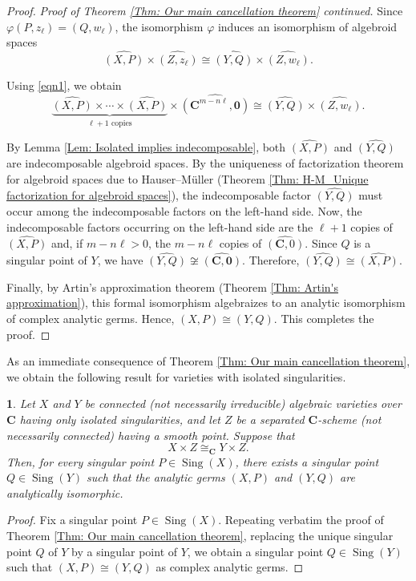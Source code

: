 \documentclass[10pt,a4paper]{amsart}
\numberwithin{equation}{section}
\numberwithin{figure}{section}
\newtheorem{cor}[thm]{\protect\corollaryname}
\providecommand{\corollaryname}{Corollary}
\numberwithin{equation}{section}
\newcommand{\C}{\mathbf{C}}
\newcommand{\oo}{\mathbf{0}}
\newcommand{\Sing}{\operatorname{Sing}}
\begin{document}
\begin{proof}
\medskip

\textit{Proof of Theorem \ref{Thm: Our main cancellation theorem} continued.}
Since $\varphi(P,z_\ell)=(Q,w_\ell)$, the isomorphism $\varphi$ induces an isomorphism of algebroid spaces
\[
\widehat{(X,P)}
\times
\widehat{(Z,z_\ell)}
\cong
\widehat{(Y,Q)}
\times
\widehat{(Z,w_\ell)}.
\]

Using \eqref{eqn1}, we obtain
\[
\underbrace{\widehat{(X,P)}\times \cdots \times \widehat{(X,P)}}_{\ell+1\text{ copies}}
\times
\widehat{(\C^{m-n\ell},\oo)}
\cong
\widehat{(Y,Q)}
\times
\widehat{(Z,w_\ell)}.
\]

By Lemma \ref{Lem: Isolated implies indecomposable}, both $\widehat{(X,P)}$ and $\widehat{(Y,Q)}$ are indecomposable algebroid spaces. By the uniqueness of factorization theorem for algebroid spaces due to Hauser--M\"uller (Theorem \ref{Thm: H-M_Unique factorization for algebroid spaces}), the indecomposable factor $\widehat{(Y,Q)}$ must occur among the indecomposable factors on the left-hand side. Now, the indecomposable factors occurring on the left-hand side are the $\ell+1$ copies of $\widehat{(X,P)}$ and, if $m-n\ell>0$, the $m-n\ell$ copies of $\widehat{(\C,0)}$. Since $Q$ is a singular point of $Y$, we have
$\widehat{(Y,Q)}\not\cong\widehat{(\C,\oo)}$. Therefore, $\widehat{(Y,Q)}\cong \widehat{(X,P)}$.

Finally, by Artin's approximation theorem (Theorem \ref{Thm: Artin's approximation}), this formal isomorphism algebraizes to an analytic isomorphism of complex analytic germs. Hence, $(X,P)\cong (Y,Q)$. This completes the proof.
\end{proof}

As an immediate consequence of Theorem \ref{Thm: Our main cancellation theorem}, we obtain the following result for varieties with isolated singularities.

\begin{cor}\label{Cor: Cancellation theorem for isolated singularities}
Let $X$ and $Y$ be connected (not necessarily irreducible) algebraic varieties over $\C$ having only isolated singularities, and let $Z$ be a separated $\C$-scheme (not necessarily connected) having a smooth point. Suppose that
\[
X\times Z \cong_{\C} Y\times Z.
\]
Then, for every singular point $P\in \Sing(X)$, there exists a singular point $Q\in \Sing(Y)$ such that the analytic germs $(X,P)$ and $(Y,Q)$ are analytically isomorphic.
\end{cor}

\begin{proof}
Fix a singular point $P\in \Sing(X)$. Repeating verbatim the proof of Theorem \ref{Thm: Our main cancellation theorem}, replacing the unique singular point $Q$ of $Y$ by a singular point of $Y$, we obtain a singular point $Q\in \Sing(Y)$ such that $(X,P)\cong (Y,Q)$ as complex analytic germs.
\end{proof}
\end{document}
